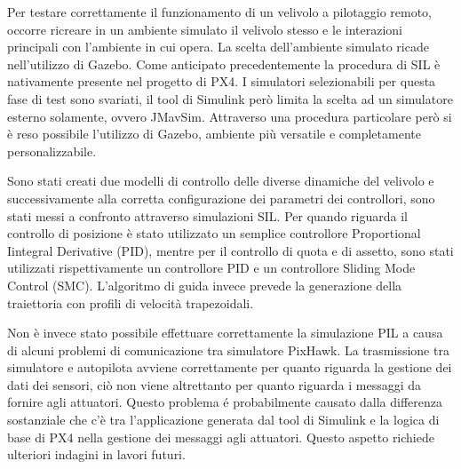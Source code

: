 Per testare correttamente il funzionamento di un velivolo a pilotaggio remoto, occorre ricreare in un ambiente simulato il velivolo stesso e le interazioni principali con l'ambiente in cui opera. La scelta dell'ambiente simulato ricade nell'utilizzo di Gazebo. Come anticipato precedentemente la procedura di SIL è nativamente presente nel progetto di PX4. I simulatori selezionabili per questa fase di test sono svariati, il tool di Simulink però limita la scelta ad un simulatore esterno solamente, ovvero JMavSim. Attraverso una procedura particolare però si è reso possibile l'utilizzo di Gazebo, ambiente più versatile e completamente personalizzabile.

Sono stati creati due modelli di controllo delle diverse dinamiche del velivolo e successivamente alla corretta configurazione dei parametri dei controllori, sono stati messi a confronto attraverso simulazioni SIL. Per quando riguarda il controllo di posizione è stato utilizzato un semplice controllore Proportional Iintegral Derivative (PID), mentre per il controllo di quota e di assetto, sono stati utilizzati rispettivamente un controllore PID e un controllore Sliding Mode Control (SMC). L'algoritmo di guida invece prevede la generazione della traiettoria con profili di velocità trapezoidali.

Non è invece stato possibile effettuare correttamente la simulazione PIL a causa di alcuni problemi di comunicazione tra simulatore PixHawk. La trasmissione tra simulatore e autopilota avviene correttamente per quanto riguarda la gestione dei dati dei sensori, ciò non viene altrettanto per quanto riguarda i messaggi da fornire agli attuatori. Questo problema é probabilmente causato dalla differenza sostanziale che c'è tra l'applicazione generata dal tool di Simulink e la logica di base di PX4 nella gestione dei messaggi agli attuatori. Questo aspetto richiede ulteriori indagini in lavori futuri.

